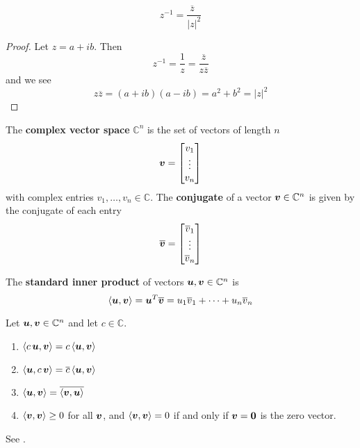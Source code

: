 \begin{proposition}
$$
z^{-1} = \frac{\overline{z} \ \, }{|z|^2}
$$

\begin{proof}
Let $z = a + ib$. Then
$$
z^{-1} = \frac{1}{z} = \frac{\overline{z}}{z \overline{z}}
$$
and we see
$$
z \overline{z} = (a + ib)(a - ib) = a^2 + b^2 = |z|^2
$$
\end{proof}
\end{proposition}

\begin{definition}
The {\bf complex vector space} $\mathbb{C}^n$ \cite[p.461]{KN} is the set of vectors of length $n$
$$
\boldsymbol{v} = \begin{bmatrix} v_1 \\ \vdots \\ v_n \end{bmatrix}
$$
with complex entries $v_1, \dots, v_n \in \mathbb{C}$. The {\bf conjugate} of a vector $\boldsymbol{v} \in \mathbb{C}^n$ is given by the conjugate of each entry
$$
\overline{\boldsymbol{v}} = \begin{bmatrix} \overline{v}_1 \\ \vdots \\ \overline{v}_n \end{bmatrix}
$$
\end{definition}

\begin{definition}
The {\bf standard inner product} \cite[p.462]{KN} of vectors $\boldsymbol{u},\boldsymbol{v} \in \mathbb{C}^n$ is
$$
\langle \boldsymbol{u} , \boldsymbol{v} \rangle = \boldsymbol{u}^T \overline{ \boldsymbol{v} } = u_1 \overline{v}_1 + \cdots + u_n \overline{v}_n
$$
\end{definition}

\begin{proposition}
Let $\boldsymbol{u} , \boldsymbol{v} \in \mathbb{C}^n$ and let $c \in \mathbb{C}$.
\begin{enumerate}
\item $\langle c \, \boldsymbol{u} , \boldsymbol{v} \rangle = c \, \langle \boldsymbol{u} , \boldsymbol{v} \rangle$
\item $\langle \boldsymbol{u} , c \, \boldsymbol{v} \rangle = \overline{c} \, \langle \boldsymbol{u} , \boldsymbol{v} \rangle$
\item $\langle \boldsymbol{u} , \boldsymbol{v} \rangle = \overline{\langle \boldsymbol{v} , \boldsymbol{u} \rangle}$
\item $\langle \boldsymbol{v} , \boldsymbol{v} \rangle \geq 0$ for all $\boldsymbol{v}$, and $\langle \boldsymbol{v} , \boldsymbol{v} \rangle = 0$ if and only if $\boldsymbol{v} = \boldsymbol{0}$ is the zero vector.
\end{enumerate}
See \cite[p.462]{KN}.
\end{proposition}

